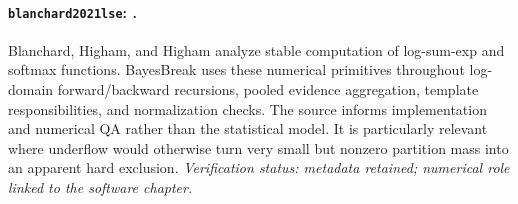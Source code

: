 
\paragraph{\texttt{blanchard2021lse}: \citet{blanchard2021lse}.}
Blanchard, Higham, and Higham analyze stable computation of log-sum-exp and softmax functions. BayesBreak uses these numerical primitives throughout log-domain forward/backward recursions, pooled evidence aggregation, template responsibilities, and normalization checks. The source informs implementation and numerical QA rather than the statistical model. It is particularly relevant where underflow would otherwise turn very small but nonzero partition mass into an apparent hard exclusion. \textit{Verification status: metadata retained; numerical role linked to the software chapter.}
